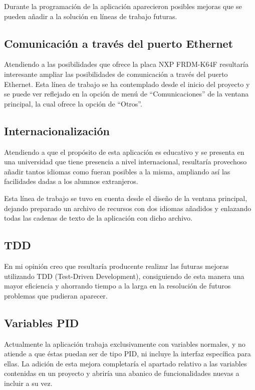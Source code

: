 Durante la programación de la aplicación aparecieron posibles mejoras que se pueden añadir a la solución en líneas de trabajo futuras.

\subsection{Comunicación a través del puerto Ethernet}

Atendiendo a las posibilidades que ofrece la placa NXP FRDM-K64F resultaría interesante ampliar las posibilidades de comunicación a través  del puerto Ethernet. Esta línea de trabajo se ha contemplado desde el inicio del proyecto y se puede ver reflejado en la opción de menú de ``Comunicaciones'' de la ventana principal, la cual ofrece la opción de ``Otros''.

\subsection{Internacionalización}

Atendiendo a que el propósito de esta aplicación es educativo y se presenta en una universidad que tiene presencia a nivel internacional, resultaría provechoso añadir tantos idiomas como fueran posibles a la misma, ampliando así las facilidades dadas a los alumnos extranjeros.

Esta línea de trabajo se tuvo en cuenta desde el diseño de la ventana principal, dejando preparado un archivo de recursos con dos idiomas añadidos y enlazando todas las cadenas de texto de la aplicación con dicho archivo.

\subsection{TDD}

En mi opinión creo que resultaría producente realizar las futuras mejoras utilizando TDD (Test-Driven Development), consiguiendo de esta manera una mayor eficiencia y ahorrando tiempo a la larga en la resolución de futuros problemas que pudieran aparecer.

\subsection{Variables PID}

Actualmente la aplicación trabaja exclusivamente con variables normales, y no atiende a que éstas puedan ser de tipo PID, ni incluye la interfaz específica para ellas. La adición de esta mejora completaría el apartado relativo a las variables contenidas en un proyecto y abriría una abanico de funcionalidades nuevas a incluir a su vez.

